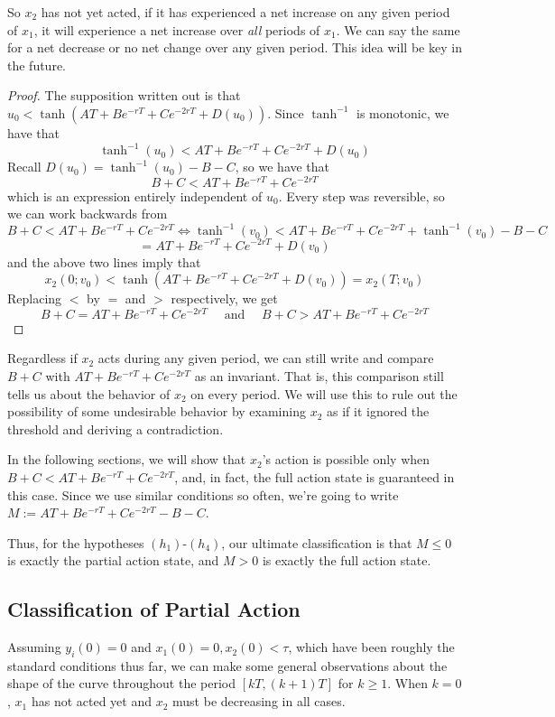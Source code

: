 \documentclass[preprint,12pt]{elsarticle}
\newcommand{\lt}{\left}
\newcommand{\rt}{\right}
\begin{document}
So $x_2$ has not yet acted, if it has experienced a net increase on any given period of $x_1$, it will experience a net increase over \textit{all} periods of $x_1$. We can say the same for a net decrease or no net change over any given period. This idea will be key in the future.

\begin{proof} The supposition written out is that $u_0 <  \tanh(AT+Be^{-rT}+Ce^{-2rT} + D(u_0))$. Since $\tanh^{-1}$ is monotonic, we have that \[
\tanh^{-1}(u_0) <  AT +Be^{-rT}+Ce^{-2rT} + D(u_0)
\]
Recall $D(u_0) = \tanh^{-1}(u_0) - B - C$, so we have that \[
 B+ C<  AT+Be^{-rT}+Ce^{-2rT} 
\]
which is an expression entirely independent of $u_0$. Every step was reversible, so we can work backwards from  \[
 B+ C<  AT+Be^{-rT}+Ce^{-2rT} \Longleftrightarrow \tanh^{-1}(v_0) < AT + Be^{-rT}+ Ce^{-2rT} + \tanh^{-1}(v_0) - B - C
\]
\[
=  AT + Be^{-rT}+ Ce^{-2rT} + D(v_0)
\] 
and the above two lines imply that \[
x_2(0;v_0) < \tanh\lt(AT + Be^{-rT}+ Ce^{-2rT} + D(v_0)\rt) = x_2(T;v_0)
\]
Replacing $<$ by $=$ and $>$ respectively, we get \[
B+ C =   AT+Be^{-rT}+Ce^{-2rT} \quad \text{ and } \quad B+ C > AT+Be^{-rT}+Ce^{-2rT}
\]
\end{proof}
Regardless if $x_2$ acts during any given period, we can still write and compare $B + C$ with $AT+Be^{-rT}+Ce^{-2rT}$ as an invariant. That is, this comparison still tells us about the behavior of $x_2$ on every period. We will use this to rule out the possibility of some undesirable behavior by examining $x_2$ as if it ignored the threshold and deriving a contradiction. 

In the following sections, we will show that $x_2$'s action is possible only when $B+C < AT+Be^{-rT}+Ce^{-2rT}$, and, in fact, the full action state is guaranteed in this case. Since we use similar conditions so often, we're going to write $M := AT+Be^{-rT}+Ce^{-2rT} - B - C$.

Thus, for the hypotheses $(h_1)$-$(h_4)$, our ultimate classification is that $M \leq 0$ is exactly the partial action state, and $M > 0$ is exactly the full action state.

\subsection{Classification of Partial Action}\label{subsec:PartialAction}
Assuming $y_i(0) = 0$ and $x_1(0) = 0, x_2(0) < \tau$, which have been roughly the standard conditions thus far, we can make some general observations about the shape of the curve throughout the period $[kT, (k+1)T]$ for $k \geq 1$. When $k = 0$, $x_1$ has not acted yet and $x_2$ must be decreasing in all cases. 
\end{document}
